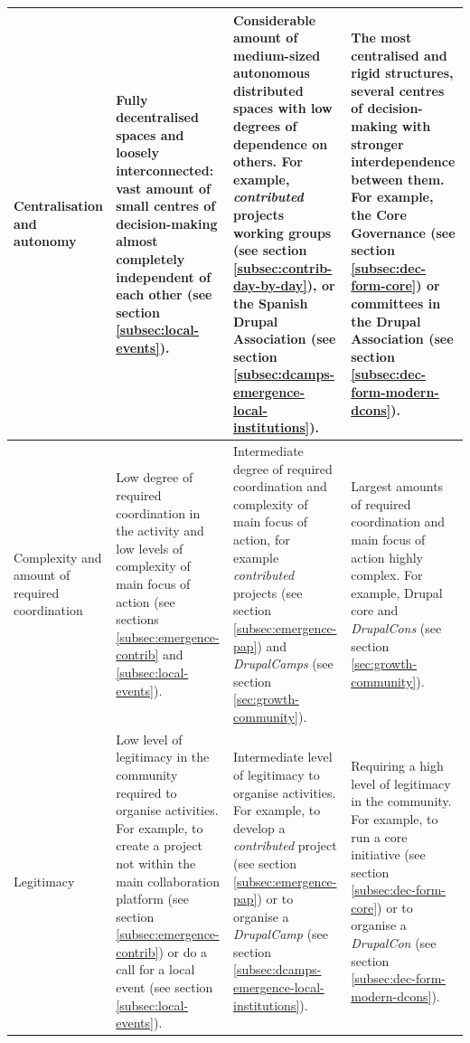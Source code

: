 \begin{footnotesize}
\begin{longtable}{|p{3cm}||p{3.4cm}|p{3.4cm}|p{3.4cm}|}
Centralisation and autonomy &
Fully decentralised spaces and loosely interconnected: vast amount of small centres of decision-making almost completely independent of each other (see section \ref{subsec:local-events}). &
Considerable amount of medium-sized autonomous distributed spaces with low degrees of dependence on others. For example, \textit{contributed} projects working groups (see section \ref{subsec:contrib-day-by-day}), or the Spanish Drupal Association (see section \ref{subsec:dcamps-emergence-local-institutions}). &
The most centralised and rigid structures, several centres of decision-making with stronger interdependence between them. For example, the Core Governance (see section \ref{subsec:dec-form-core}) or committees in the Drupal Association (see section \ref{subsec:dec-form-modern-dcons}). \\ \hline

Complexity and amount of required coordination &
Low degree of required coordination in the activity and low levels of complexity of main focus of action (see sections \ref{subsec:emergence-contrib} and \ref{subsec:local-events}). &
Intermediate degree of required coordination and complexity of main focus of action, for example \textit{contributed} projects (see section \ref{subsec:emergence-pap}) and \textit{DrupalCamps} (see section \ref{sec:growth-community}). &
Largest amounts of required coordination and main focus of action highly complex. For example, Drupal core and \textit{DrupalCons} (see section \ref{sec:growth-community}).  \\ \hline

Legitimacy &
Low level of legitimacy in the community required to organise activities. For example, to create a project not within the main collaboration platform (see section \ref{subsec:emergence-contrib}) or do a call for a local event (see section \ref{subsec:local-events}). &
Intermediate level of legitimacy to organise activities. For example, to develop a \textit{contributed} project (see section \ref{subsec:emergence-pap}) or to organise a \textit{DrupalCamp} (see section \ref{subsec:dcamps-emergence-local-institutions}). &
Requiring a high level of legitimacy in the community. For example, to run a core initiative (see section \ref{subsec:dec-form-core}) or to organise a \textit{DrupalCon} (see section \ref{subsec:dec-form-modern-dcons}). \\ \hline


\end{longtable}
\end{footnotesize}
